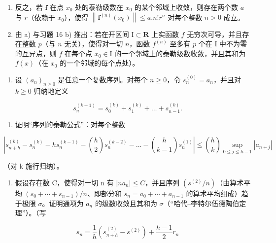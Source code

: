 \begin{enumerate}
\def\labelenumi{\alph{enumi})}
\setcounter{enumi}{1}
\item
  反之，若 \(\mathbf{f}\) 在点 \(x_0\) 处的泰勒级数在 \(x_0\) 的某个邻域上收敛，则存在两个数 \(a\) 与 \(r\)（依赖于 \(x_0\)），使得 \(\left\| \mathbf{f}^{(n)}(x_0)\right\| \leqslant a.n!r^n\) 对每个整数 \(n > 0\) 成立。
\item
  由 a) 与习题 16 b) 推出：若在开区间 \(\mathrm{I} \subset \mathbf{R}\) 上实函数 \(f\) 无穷次可导，并且存在整数 \(p\)（与 \(n\) 无关），使得对一切 \(n\)，函数 \(f^{(n)}\) 至多有 \(p\) 个在 \(\mathrm{I}\) 中不为零的互异点，则 \(f\) 在每个点 \(x_0 \in \mathrm{I}\) 的一个邻域上的泰勒级数收敛，并且其和为 \(f(x)\)（在 \(x_0\) 的一个邻域的每个点处）。
\end{enumerate}

\begin{enumerate}
\def\labelenumi{\arabic{enumi})}
\setcounter{enumi}{17}
\tightlist
\item
  设 \((a_{n})_{n\geqslant 0}\) 是任意一个复数序列。对每个 \(n\geqslant 0\)，令 \(s_n^{(0)} = a_n\)，并且对 \(k\geqslant 0\) 归纳地定义
\end{enumerate}

\[
s _ {n} ^ {(k + 1)} = s _ {0} ^ {(k)} + s _ {1} ^ {(k)} + \dots + s _ {n - 1} ^ {(k)}.
\]

\begin{enumerate}
\def\labelenumi{\alph{enumi})}
\tightlist
\item
  证明“序列的泰勒公式”：对每个整数
\end{enumerate}

\[
\left| s _ {n + h} ^ {(k)} - s _ {n} ^ {(k)} - h s _ {n} ^ {(k - 1)} - \binom {h} {2} s _ {n} ^ {(k - 2)} - \dots - \binom {h} {k - 1} s _ {n} ^ {(1)} \right| \leqslant \binom {h} {k} \sup _ {0 \leqslant j \leqslant h - 1} | a _ {n + j} |
\]

（对 k 施行归纳）。

\begin{enumerate}
\def\labelenumi{\alph{enumi})}
\setcounter{enumi}{1}
\tightlist
\item
  假设存在数 C，使得对一切 n 有 \(|na_{n}| \leqslant C\)，并且序列 \((s^{(2)}/n)\)（由算术平均 \((s_{0} + \cdots + s_{n-1})/n\)、即部分和 \(s_{n} = a_{0} + \cdots + a_{n-1}\) 的算术平均组成）趋于极限 \(\sigma\)。证明通项为 \(a_{n}\) 的级数收敛且其和为 \(\sigma\)（“哈代–李特尔伍德陶伯定理”）。（写
\end{enumerate}

\[
s _ {n} = \frac {1}{h} \left(s _ {n + h} ^ {(2)} - s ^ {(2)}\right) + \frac {h - 1}{2} r _ {n}
\]


